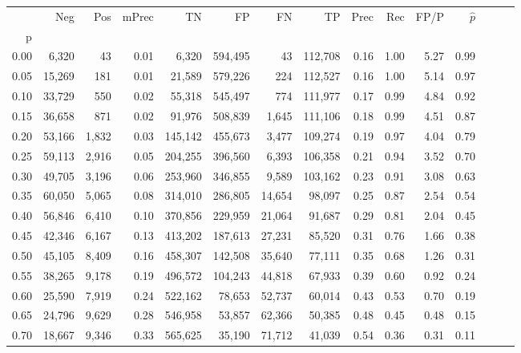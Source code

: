 \begin{tabular}{rrrrrrrrrrrrrrr}
\toprule
{} &     Neg &    Pos & mPrec &       TN &       FP &       FN &       TP &  Prec &   Rec &  FP/P & $\hat{p}$ \\
p    &         &        &       &          &          &          &          &       &       &       &           \\
\midrule
0.00 &   6,320 &     43 &  0.01 &    6,320 &  594,495 &       43 &  112,708 &  0.16 &  1.00 &  5.27 &      0.99 \\
0.05 &  15,269 &    181 &  0.01 &   21,589 &  579,226 &      224 &  112,527 &  0.16 &  1.00 &  5.14 &      0.97 \\
0.10 &  33,729 &    550 &  0.02 &   55,318 &  545,497 &      774 &  111,977 &  0.17 &  0.99 &  4.84 &      0.92 \\
0.15 &  36,658 &    871 &  0.02 &   91,976 &  508,839 &    1,645 &  111,106 &  0.18 &  0.99 &  4.51 &      0.87 \\
0.20 &  53,166 &  1,832 &  0.03 &  145,142 &  455,673 &    3,477 &  109,274 &  0.19 &  0.97 &  4.04 &      0.79 \\
0.25 &  59,113 &  2,916 &  0.05 &  204,255 &  396,560 &    6,393 &  106,358 &  0.21 &  0.94 &  3.52 &      0.70 \\
0.30 &  49,705 &  3,196 &  0.06 &  253,960 &  346,855 &    9,589 &  103,162 &  0.23 &  0.91 &  3.08 &      0.63 \\
0.35 &  60,050 &  5,065 &  0.08 &  314,010 &  286,805 &   14,654 &   98,097 &  0.25 &  0.87 &  2.54 &      0.54 \\
0.40 &  56,846 &  6,410 &  0.10 &  370,856 &  229,959 &   21,064 &   91,687 &  0.29 &  0.81 &  2.04 &      0.45 \\
0.45 &  42,346 &  6,167 &  0.13 &  413,202 &  187,613 &   27,231 &   85,520 &  0.31 &  0.76 &  1.66 &      0.38 \\
0.50 &  45,105 &  8,409 &  0.16 &  458,307 &  142,508 &   35,640 &   77,111 &  0.35 &  0.68 &  1.26 &      0.31 \\
0.55 &  38,265 &  9,178 &  0.19 &  496,572 &  104,243 &   44,818 &   67,933 &  0.39 &  0.60 &  0.92 &      0.24 \\
0.60 &  25,590 &  7,919 &  0.24 &  522,162 &   78,653 &   52,737 &   60,014 &  0.43 &  0.53 &  0.70 &      0.19 \\
0.65 &  24,796 &  9,629 &  0.28 &  546,958 &   53,857 &   62,366 &   50,385 &  0.48 &  0.45 &  0.48 &      0.15 \\
0.70 &  18,667 &  9,346 &  0.33 &  565,625 &   35,190 &   71,712 &   41,039 &  0.54 &  0.36 &  0.31 &      0.11 \\

\end{tabular}
